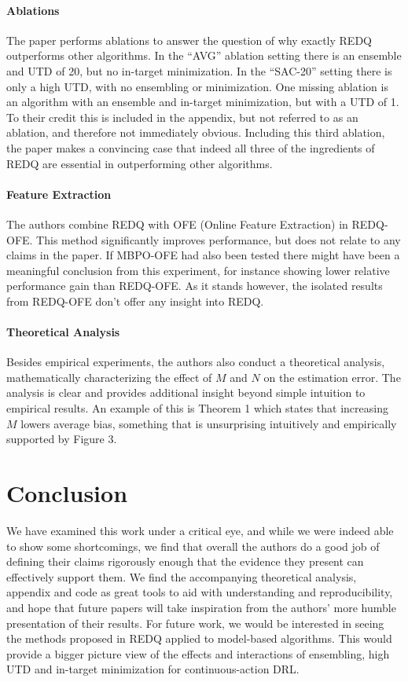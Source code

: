 \documentclass{article}
\begin{document}
\paragraph{Ablations} The paper performs ablations to answer the question of why exactly REDQ outperforms other algorithms. In the ``AVG'' ablation setting there is an ensemble and UTD of 20, but no in-target minimization. In the ``SAC-20'' setting there is only a high UTD, with no ensembling or minimization. One missing ablation is an algorithm with an ensemble and in-target minimization, but with a UTD of 1. To their credit this is included in the appendix, but not referred to as an ablation, and therefore not immediately obvious. Including this third ablation, the paper makes a convincing case that indeed all three of the ingredients of REDQ are essential in outperforming other algorithms.
\paragraph{Feature Extraction} The authors combine REDQ with OFE (Online Feature Extraction) \citep{ota_can_2020} in REDQ-OFE. This method significantly improves performance, but does not relate to any claims in the paper. If MBPO-OFE had also been tested there might have been a meaningful conclusion from this experiment, for instance showing lower relative performance gain than REDQ-OFE. As it stands however, the isolated results from REDQ-OFE don't offer any insight into REDQ.
\paragraph{Theoretical Analysis} Besides empirical experiments, the authors also conduct a theoretical analysis, mathematically characterizing the effect of $M$ and $N$ on the estimation error. The analysis is clear and provides additional insight beyond simple intuition to empirical results. An example of this is Theorem 1 which states that increasing $M$ lowers average bias, something that is unsurprising intuitively and empirically supported by Figure 3.
\section{Conclusion}
We have examined this work under a critical eye, and while we were indeed able to show some shortcomings, we find that overall the authors do a good job of defining their claims rigorously enough that the evidence they present can effectively support them. We find the accompanying theoretical analysis, appendix and code as great tools to aid with understanding and reproducibility, and hope that future papers will take inspiration from the authors' more humble presentation of their results. For future work, we would be interested in seeing the methods proposed in REDQ applied to model-based algorithms. This would provide a bigger picture view of the effects and interactions of ensembling, high UTD and in-target minimization for continuous-action DRL.


\end{document}
